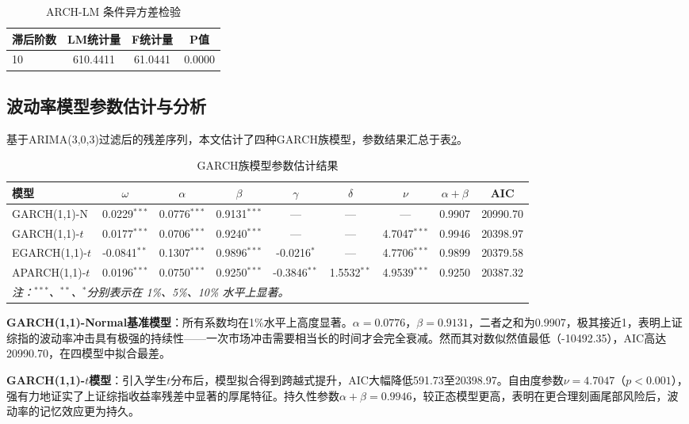 \documentclass[12pt,a4paper]{ctexart}
\begin{document}
\begin{table}[htbp]
  \centering
  \caption{ARCH-LM 条件异方差检验}
  \label{tab:arch_test}
  \begin{tabular}{lccc}
    \toprule
    滞后阶数 & LM统计量 & F统计量 & P值 \\
    \midrule
    10 & 610.4411 & 61.0441 & 0.0000 \\
    \bottomrule
  \end{tabular}
\end{table}

\subsection{波动率模型参数估计与分析}

基于ARIMA(3,0,3)过滤后的残差序列，本文估计了四种GARCH族模型，参数结果汇总于表\ref{tab:model_params}。

\begin{table}[htbp]
  \centering
  \caption{GARCH族模型参数估计结果}
  \label{tab:model_params}
  \begin{tabular}{lcccccccc}
    \toprule
    模型 & $\omega$ & $\alpha$ & $\beta$ & $\gamma$ & $\delta$ & $\nu$ & $\alpha+\beta$ & AIC \\
    \midrule
    GARCH(1,1)-N & 0.0229$^{***}$ & 0.0776$^{***}$ & 0.9131$^{***}$ & --- & --- & --- & 0.9907 & 20990.70 \\
    GARCH(1,1)-$t$ & 0.0177$^{***}$ & 0.0706$^{***}$ & 0.9240$^{***}$ & --- & --- & 4.7047$^{***}$ & 0.9946 & 20398.97 \\
    EGARCH(1,1)-$t$ & -0.0841$^{**}$ & 0.1307$^{***}$ & 0.9896$^{***}$ & -0.0216$^{*}$ & --- & 4.7706$^{***}$ & 0.9899 & 20379.58 \\
    APARCH(1,1)-$t$ & 0.0196$^{***}$ & 0.0750$^{***}$ & 0.9250$^{***}$ & -0.3846$^{**}$ & 1.5532$^{**}$ & 4.9539$^{***}$ & 0.9250 & 20387.32 \\
    \bottomrule
    \multicolumn{9}{l}{\textit{注：$^{***}$、$^{**}$、$^{*}$分别表示在 1\%、5\%、10\% 水平上显著。}}
  \end{tabular}
\end{table}

\textbf{GARCH(1,1)-Normal基准模型}：所有系数均在1\%水平上高度显著。$\alpha=0.0776$，$\beta=0.9131$，二者之和为0.9907，极其接近1，表明上证综指的波动率冲击具有极强的持续性——一次市场冲击需要相当长的时间才会完全衰减。然而其对数似然值最低（-10492.35），AIC高达20990.70，在四模型中拟合最差。

\textbf{GARCH(1,1)-$t$模型}：引入学生$t$分布后，模型拟合得到跨越式提升，AIC大幅降低591.73至20398.97。自由度参数$\nu=4.7047$（$p<0.001$），强有力地证实了上证综指收益率残差中显著的厚尾特征。持久性参数$\alpha+\beta=0.9946$，较正态模型更高，表明在更合理刻画尾部风险后，波动率的记忆效应更为持久。
\end{document}
